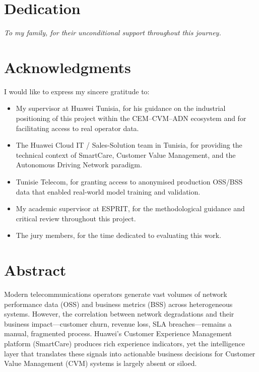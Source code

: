 \chapter*{Dedication}
\vspace*{2cm}
\begin{center}
\textit{To my family, for their unconditional support throughout this journey.}
\end{center}
\newpage

\chapter*{Acknowledgments}

I would like to express my sincere gratitude to:

\begin{itemize}[leftmargin=1.5cm]
  \item My supervisor at Huawei Tunisia, for his guidance on the industrial positioning of this project within the CEM--CVM--ADN ecosystem and for facilitating access to real operator data.
  \item The Huawei Cloud IT / Sales-Solution team in Tunisia, for providing the technical context of SmartCare, Customer Value Management, and the Autonomous Driving Network paradigm.
  \item Tunisie Telecom, for granting access to anonymised production OSS/BSS data that enabled real-world model training and validation.
  \item My academic supervisor at ESPRIT, for the methodological guidance and critical review throughout this project.
  \item The jury members, for the time dedicated to evaluating this work.
\end{itemize}
\newpage

\chapter*{Abstract}

Modern telecommunications operators generate vast volumes of network performance data (OSS) and business metrics (BSS) across heterogeneous systems. However, the correlation between network degradations and their business impact---customer churn, revenue loss, SLA breaches---remains a manual, fragmented process. Huawei's Customer Experience Management platform (SmartCare) produces rich experience indicators, yet the intelligence layer that translates these signals into actionable business decisions for Customer Value Management (CVM) systems is largely absent or siloed.

